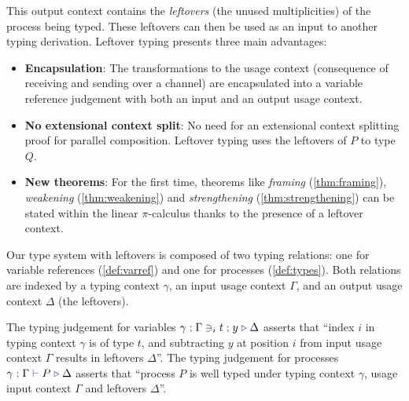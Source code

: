 \documentclass[a4paper,UKenglish,cleveref,autoref,thm-restate,authorcolumns]{lipics-v2019}
\theoremstyle{definition}
\newcommand{\picalc}{$\pi$-calculus}
\newcommand{\type}[1]{\textcolor{BlueViolet}{\operatorname{#1}}}
\newcommand{\constr}[1]{\textcolor{BurntOrange}{\operatorname{#1}}}
\newcommand{\func}[1]{\textcolor{OliveGreen}{\operatorname{#1}}}
\newcommand{\comp}[2]{#1 \; \constr{\parallel} \; #2}
\newcommand{\opctx}[3]{#1 \, \func{\coloneqq} \, #2 \, \func{\otimes} \, #3}
\newcommand{\types}[4]{#1 \; \type{;} \; #2 \; \type{\vdash} \; #3 \; \type{\triangleright} \; #4}
\newcommand{\contains}[6]{#1 \; \type{;} \; #2 \; \type{\ni}_{#3} \; #4 \; \type{;} \; #5 \; \type{\triangleright} \; #6}
\begin{document}
This output context contains the \emph{leftovers} (the unused multiplicities) of the process being typed.
These leftovers can then be used as an input to another typing derivation.
Leftover typing presents three main advantages:
\begin{itemize}
  \item \textbf{Encapsulation}:
    The transformations to the usage context (consequence of receiving and sending over a channel) are encapsulated into a variable reference judgement with both an input and an output usage context.
  \item \textbf{No extensional context split}:
    No need for an extensional context splitting proof for parallel composition.
    Leftover typing uses the leftovers of $P$ to type $Q$.
  \item \textbf{New theorems}:
    For the first time, theorems like \emph{framing} (\autoref{thm:framing}), \emph{weakening} (\autoref{thm:weakening}) and \emph{strengthening} (\autoref{thm:strengthening}) can be stated within the linear \picalc{} thanks to the presence of a leftover context.
\end{itemize}

Our type system with leftovers is composed of two typing relations: one for variable references (\autoref{def:varref}) and one for processes (\autoref{def:types}).
Both relations are indexed by a typing context $\gamma$, an input usage context $\Gamma$, and an output usage context $\Delta$ (the leftovers).

The typing judgement for variables $\contains{\gamma}{\Gamma}{i}{t}{y}{\Delta}$ asserts that ``index $i$ in typing context $\gamma$ is of type $t$, and subtracting $y$ at position $i$ from input usage context $\Gamma$ results in leftovers $\Delta$''.
The typing judgement for processes $\types{\gamma}{\Gamma}{P}{\Delta}$ asserts that ``process $P$ is well typed under typing context $\gamma$, usage input context $\Gamma$ and leftovers $\Delta$''.
\end{document}

